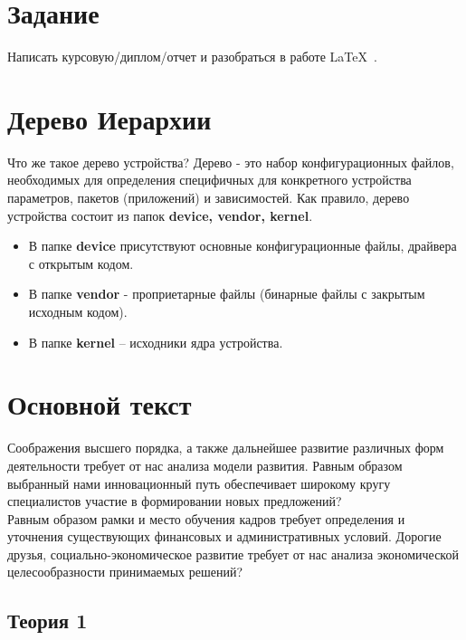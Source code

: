 
\section*{Задание}
Написать курсовую/диплом/отчет и разобраться в работе \LaTeX\ .

\section{Дерево Иерархии}
Что же такое дерево устройства? Дерево - это набор конфигурационных
файлов, необходимых для определения специфичных для конкретного устройства параметров, пакетов (приложений) и зависимостей. Как правило, дерево устройства состоит из папок \textbf{device, vendor, kernel}.
\begin{itemize}
\item В папке \textbf{device} присутствуют основные конфигурационные файлы, драйвера с открытым кодом.
\item В папке \textbf{vendor} - проприетарные файлы (бинарные файлы с закрытым исходным кодом).
\item В папке \textbf{kernel} – исходники ядра устройства.
\end{itemize}


\section{Основной текст}
Соображения высшего порядка, а также дальнейшее развитие различных форм деятельности требует от нас анализа модели развития. Равным образом выбранный нами инновационный путь обеспечивает широкому кругу специалистов участие в формировании новых предложений?\\
Равным образом рамки и место обучения кадров требует определения и уточнения существующих финансовых и административных условий.
Дорогие друзья, социально-экономическое развитие требует от нас анализа экономической целесообразности принимаемых решений? \cite{kistyakovskii} %

\subsection{Теория 1}

